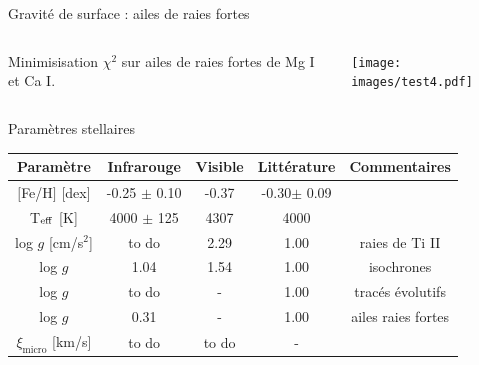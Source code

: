 \documentclass[10pt]{beamer}
\begin{document}
\begin{frame}[fragile]{Gravité de surface : ailes de raies fortes}
   \begin{columns}
       \begin{column}{0.3\textwidth}
        Minimisisation $\chi^2$ sur ailes de raies fortes de Mg I et Ca I.
       \end{column}
       \begin{column}{0.7\textwidth}
           \begin{center}
            \texttt{[image: images/test4.pdf]}  
           \end{center}
       \end{column}
       \end{columns}
\end{frame}

\begin{frame}[fragile]{Paramètres stellaires}
    \begin{table}[h!]
        \begin{center}
            \renewcommand{\arraystretch}{1.5}
            \begin{tabular}{c|ccc|c}
                Paramètre & Infrarouge &Visible& Littérature &Commentaires\\
                \hline
                
                $[$Fe/H$]$ [dex]& -0.25 $\pm$ 0.10 & -0.37 &
                -0.30$\pm$ 0.09&\\

                T$_{\rm eff}$ [K] & 4000 $\pm$ 125 &4307 & 4000& \\
    
                \rowcolor{gray!15} log $g$ [cm/s$^2$]& to do & 2.29 & 1.00&raies de Ti II\\
                log $g$  & 1.04 & 1.54 & 1.00 &isochrones\\
                \rowcolor{gray!15}log $g$  & to do & - & 1.00 &tracés évolutifs\\
                log $g$ & 0.31 &-& 1.00 &ailes raies fortes\\
                \rowcolor{gray!15} $\xi_{\text{micro}}$ [km/s]& to do & to do & - &\\
            \end{tabular}
        \end{center}
    \end{table}
    \end{frame}
\end{document}
